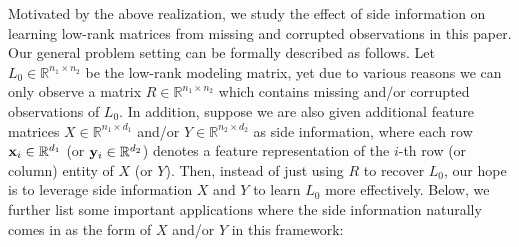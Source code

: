\documentclass[twoside,11pt]{article}
\def\bx{{\bf x}}
\def\by{{\bf y}}
\def\R{\mathbb{R}}
\def\realL{L_0}
\begin{document}
Motivated by the above realization, %
we study the effect of side information on learning low-rank matrices from missing
and corrupted observations in this paper.
Our general problem setting can be formally described as follows.
Let $\realL \in \R^{n_1\times n_2}$ be the low-rank modeling matrix,
yet due to various reasons we can only observe a matrix $R\in\R^{n_1\times n_2}$ which
contains missing and/or corrupted observations of $\realL$.
In addition, suppose we are also given additional feature matrices
$X \in \R^{n_1 \times d_1}$ and/or $Y \in \R^{n_2 \times d_2}$ %
as side information,
where each row $\bx_i \in \R^{d_1}$ (or $\by_i \in \R^{d_2}$) denotes a feature representation of the $i$-th
row (or column) entity of $X$ (or $Y$).
Then, instead of just using $R$ to recover $\realL$,
our hope is to leverage side information $X$ and $Y$ to learn $\realL$
more effectively.  Below, we further list some important applications where
the side information naturally comes in as the form of $X$ and/or $Y$ in this framework:
\end{document}
